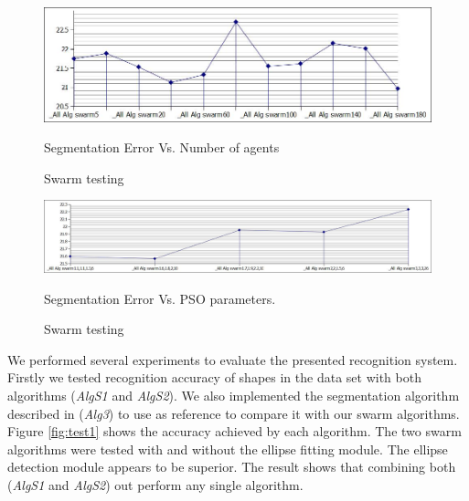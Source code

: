 \documentclass{article}
\begin{document}
 \begin{figure}
	\centering		
	 \includegraphics[scale=0.3]{images/swarmTesting.jpg}
	 	\caption{Swarm testing} Segmentation Error Vs. Number of agents
	 	\label{fig:swarmtesting}
\end{figure} 

\begin{figure}
	\centering		
	 \includegraphics[width=18cm]{images/swarmTesting2.jpg}
	 	\caption{Swarm testing} Segmentation Error Vs. PSO parameters.
	 	\label{fig:swarmtesting2}
	
\end{figure} 
We performed several experiments to evaluate the presented recognition system. Firstly we tested recognition accuracy of shapes in the data set with both algorithms (\textsl{AlgS1} and \textsl{AlgS2}). We also implemented the segmentation algorithm described in \cite{earlyprocess} (\textsl{Alg3}) to use as reference to compare it with our swarm algorithms. Figure \ref{fig:test1} shows the accuracy achieved by each algorithm. The two swarm algorithms were tested with and without the ellipse fitting module. The ellipse detection module appears to be superior. The result shows that combining both  (\textsl{AlgS1} and \textsl{AlgS2}) out perform any single algorithm. %
\end{document}
